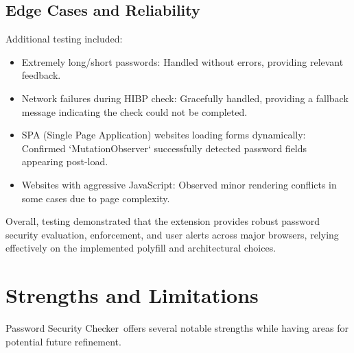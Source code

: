 \documentclass[11pt,oneside,a4paper]{book}
\newcommand{\extensionname}{Password Security Checker}
\begin{document}
\section{Edge Cases and Reliability}
Additional testing included:
\begin{itemize}
    \item Extremely long/short passwords: Handled without errors, providing relevant feedback.
    \item Network failures during HIBP check: Gracefully handled, providing a fallback message indicating the check could not be completed.
    \item SPA (Single Page Application) websites loading forms dynamically: Confirmed `MutationObserver` successfully detected password fields appearing post-load.
    \item Websites with aggressive JavaScript: Observed minor rendering conflicts in some cases due to page complexity.
\end{itemize}

Overall, testing demonstrated that the extension provides robust password security evaluation, enforcement, and user alerts across major browsers, relying effectively on the implemented polyfill and architectural choices.

\chapter{Strengths and Limitations}
\extensionname\ offers several notable strengths while having areas for potential future refinement.
\end{document}
